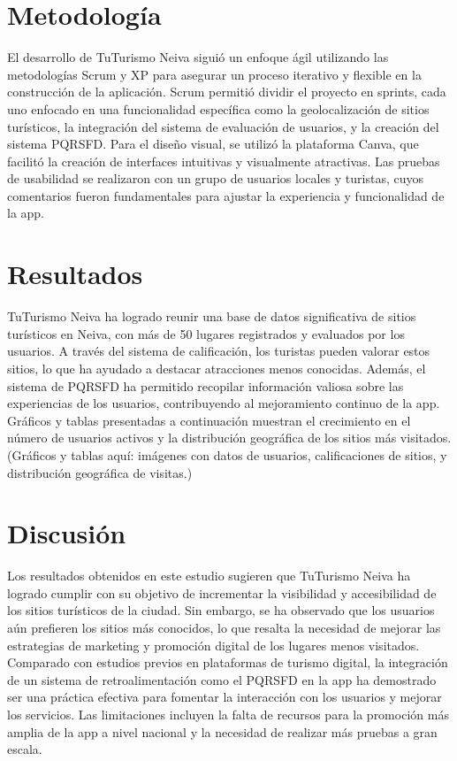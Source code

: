 \documentclass{article}
\begin{document}
\section{Metodología}
El desarrollo de TuTurismo Neiva siguió un enfoque ágil utilizando las metodologías Scrum y XP para asegurar un proceso iterativo y flexible en la construcción de la aplicación. Scrum permitió dividir el proyecto en sprints, cada uno enfocado en una funcionalidad específica como la geolocalización de sitios turísticos, la integración del sistema de evaluación de usuarios, y la creación del sistema PQRSFD. Para el diseño visual, se utilizó la plataforma Canva, que facilitó la creación de interfaces intuitivas y visualmente atractivas. Las pruebas de usabilidad se realizaron con un grupo de usuarios locales y turistas, cuyos comentarios fueron fundamentales para ajustar la experiencia y funcionalidad de la app.

\section{Resultados}
TuTurismo Neiva ha logrado reunir una base de datos significativa de sitios turísticos en Neiva, con más de 50 lugares registrados y evaluados por los usuarios. A través del sistema de calificación, los turistas pueden valorar estos sitios, lo que ha ayudado a destacar atracciones menos conocidas. Además, el sistema de PQRSFD ha permitido recopilar información valiosa sobre las experiencias de los usuarios, contribuyendo al mejoramiento continuo de la app. Gráficos y tablas presentadas a continuación muestran el crecimiento en el número de usuarios activos y la distribución geográfica de los sitios más visitados. (Gráficos y tablas aquí: imágenes con datos de usuarios, calificaciones de sitios, y distribución geográfica de visitas.)

\section{Discusión}
Los resultados obtenidos en este estudio sugieren que TuTurismo Neiva ha
logrado cumplir con su objetivo de incrementar la visibilidad y accesibilidad de los
sitios turísticos de la ciudad. Sin embargo, se ha observado que los usuarios aún
prefieren los sitios más conocidos, lo que resalta la necesidad de mejorar las
estrategias de marketing y promoción digital de los lugares menos visitados.
Comparado con estudios previos en plataformas de turismo digital, la integración
de un sistema de retroalimentación como el PQRSFD en la app ha demostrado ser
una práctica efectiva para fomentar la interacción con los usuarios y mejorar los
servicios. Las limitaciones incluyen la falta de recursos para la promoción más
amplia de la app a nivel nacional y la necesidad de realizar más pruebas a gran
escala.
\end{document}
